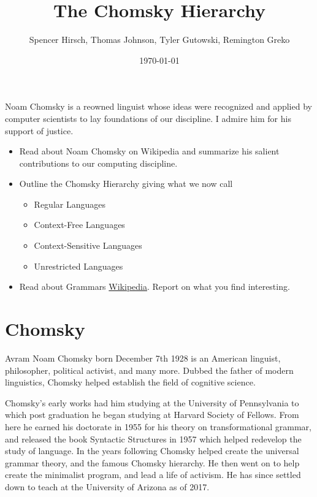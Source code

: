 \documentclass{article}
\begin{document}
\title{The Chomsky Hierarchy}
\author{Spencer Hirsch, Thomas Johnson, Tyler Gutowski, Remington Greko}
\date{\today}

\maketitle

\noindent Noam Chomsky is a reowned linguist whose ideas were recognized and applied
by computer scientists to lay foundations of our discipline. I admire him 
for his support of justice.

\begin{itemize}
    \item Read about Noam Chomsky on Wikipedia and summarize his salient 
          contributions to our computing discipline.
    
    \item Outline the Chomsky Hierarchy giving what we now call
        \begin{itemize}
            \item Regular Languages
            \item Context-Free Languages
            \item Context-Sensitive Languages
            \item Unrestricted Languages
        \end{itemize}

    \item Read about Grammars \href{https://en.wikipedia.org/wiki/Grammar}{Wikipedia}. Report on what you find interesting.
\end{itemize}

\section{Chomsky}
\medskip

Avram Noam Chomsky born December 7th 1928 is an American linguist, philosopher, political activist, and many more. 
Dubbed the father of modern linguistics, Chomsky helped establish the field of cognitive science.
\medskip

Chomsky's early works had him studying at the University of Pennsylvania to which post graduation he began studying at Harvard Society of Fellows. 
From here he earned his doctorate in 1955 for his theory on transformational grammar, and  released the book Syntactic Structures in 1957 which helped redevelop the study of language. 
In the years following Chomsky helped create the universal grammar theory, and the famous Chomsky hierarchy. He then went on to help create the minimalist program, and lead a life of activism. 
He has since settled down to teach at the University of Arizona as of 2017.
\medskip
\end{document}
